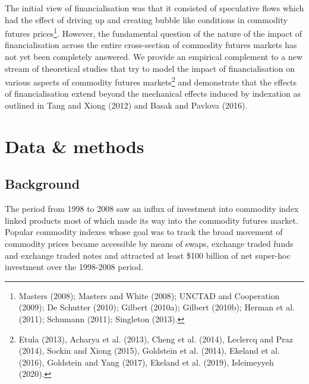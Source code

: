 \documentclass[]{elsarticle} %
\begin{document}
The initial view of financialisation was that it consisted of speculative flows which had the effect of driving up and creating bubble like conditions in commodity futures prices\footnote{Masters (2008); Masters and White (2008); UNCTAD and Cooperation (2009); De Schutter (2010); Gilbert (2010a); Gilbert (2010b); Herman et al. (2011); Schumann (2011); Singleton (2013).}. However, the fundamental question of the nature of the impact of financialisation across the entire cross-section of commodity futures markets has not yet been completely answered. We provide an empirical complement to a new stream of theoretical studies that try to model the impact of financialisation on various aspects of commodity futures markets\footnote{Etula (2013), Acharya et al. (2013), Cheng et al. (2014), Leclercq and Praz (2014), Sockin and Xiong (2015), Goldstein et al. (2014), Ekeland et al. (2016), Goldstein and Yang (2017), Ekeland et al. (2019), Isleimeyyeh (2020).} and demonstrate that the effects of financialisation extend beyond the mechanical effects induced by indexation as outlined in Tang and Xiong (2012) and Basak and Pavlova (2016).

\newpage

\hypertarget{co-movement-data-methods}{%
\section{Data \& methods}\label{co-movement-data-methods}}

\hypertarget{co-movement-background}{%
\subsection{Background}\label{co-movement-background}}

The period from 1998 to 2008 saw an influx of investment into commodity index linked products most of which made its way into the commodity futures market. Popular commodity indexes whose goal was to track the broad movement of commodity prices became accessible by means of swaps, exchange traded funds and exchange traded notes and attracted at least \$100 billion of net super-hoc investment over the 1998-2008 period.

\medskip\setlength{\parindent}{0pt}
\end{document}
